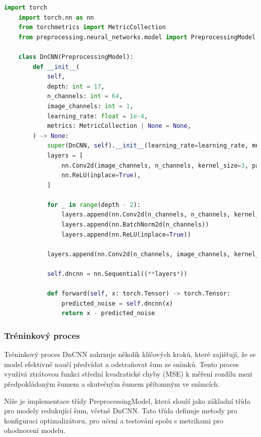 \documentclass[male,czech,api_ing]{thesis}
\begin{document}
\begin{lstlisting}[language=Python, caption={Implementace konvoluční neuronovové sítě pro redukci šumu}, label={lst:DnCNN}]
    import torch
    import torch.nn as nn
    from torchmetrics import MetricCollection
    from preprocessing.neural_networks.model import PreprocessingModel
    
    class DnCNN(PreprocessingModel):
        def __init__(
            self,
            depth: int = 17,
            n_channels: int = 64,
            image_channels: int = 1,
            learning_rate: float = 1e-4,
            metrics: MetricCollection | None = None,
        ) -> None:
            super(DnCNN, self).__init__(learning_rate=learning_rate, metrics=metrics)
            layers = [
                nn.Conv2d(image_channels, n_channels, kernel_size=3, padding=1),
                nn.ReLU(inplace=True),
            ]
    
            for _ in range(depth - 2):
                layers.append(nn.Conv2d(n_channels, n_channels, kernel_size=3, padding=1))
                layers.append(nn.BatchNorm2d(n_channels))
                layers.append(nn.ReLU(inplace=True))
    
            layers.append(nn.Conv2d(n_channels, image_channels, kernel_size=3, padding=1))
    
            self.dncnn = nn.Sequential((**layers*))
    
            def forward(self, x: torch.Tensor) -> torch.Tensor:
                predicted_noise = self.dncnn(x)
                return x - predicted_noise
\end{lstlisting}

\subsubsection{Tréninkový proces}
Tréninkový proces DnCNN zahrnuje několik klíčových kroků, které zajišťují, že se model efektivně naučí předvídat a odstraňovat šum ze snímků. Tento proces využívá ztrátovou funkci střední kvadratické chyby (MSE) k měření rozdílu mezi předpokládaným šumem a skutečným šumem přítomným ve snímcích.

Níže je implementace třídy PreprocessingModel, která slouží jako základní třída pro modely redukující šum, včetně DnCNN. Tato třída definuje metody pro konfiguraci optimalizátoru, pro učení a testování spolu s metrikami pro ohodnocení modelu.
\end{document}
